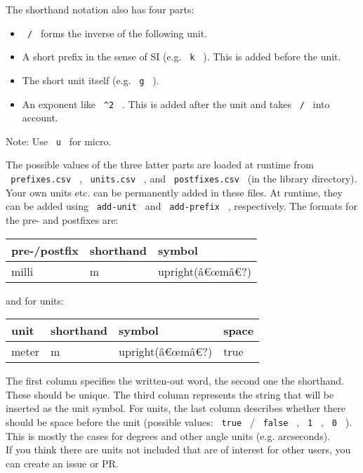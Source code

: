 The shorthand notation also has four parts:

\begin{itemize}
\tightlist
\item
  \texttt{\ /\ } forms the inverse of the following unit.
\item
  A short prefix in the sense of SI (e.g. \texttt{\ k\ } ). This is
  added before the unit.
\item
  The short unit itself (e.g. \texttt{\ g\ } ).
\item
  An exponent like \texttt{\ \^{}2\ } . This is added after the unit and
  takes \texttt{\ /\ } into account.
\end{itemize}

Note: Use \texttt{\ u\ } for micro.

The possible values of the three latter parts are loaded at runtime from
\texttt{\ prefixes.csv\ } , \texttt{\ units.csv\ } , and
\texttt{\ postfixes.csv\ } (in the library directory). Your own units
etc. can be permanently added in these files. At runtime, they can be
added using \texttt{\ add-unit\ } and \texttt{\ add-prefix\ } ,
respectively. The formats for the pre- and postfixes are:

\begin{longtable}[]{@{}lll@{}}
\toprule\noalign{}
pre-/postfix & shorthand & symbol \\
\midrule\noalign{}
\endhead
\bottomrule\noalign{}
\endlastfoot
milli & m & upright(â€œmâ€?) \\
\end{longtable}

and for units:

\begin{longtable}[]{@{}llll@{}}
\toprule\noalign{}
unit & shorthand & symbol & space \\
\midrule\noalign{}
\endhead
\bottomrule\noalign{}
\endlastfoot
meter & m & upright(â€œmâ€?) & true \\
\end{longtable}

The first column specifies the written-out word, the second one the
shorthand. These should be unique. The third column represents the
string that will be inserted as the unit symbol. For units, the last
column describes whether there should be space before the unit (possible
values: \texttt{\ true\ } / \texttt{\ false\ } , \texttt{\ 1\ } ,
\texttt{\ 0\ } ). This is mostly the cases for degrees and other angle
units (e.g. arcseconds).\\
If you think there are units not included that are of interest for other
users, you can create an issue or PR.

